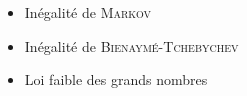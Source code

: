 \begin{itemize}
    \item Inégalité de \textsc{Markov}
    \item Inégalité de \textsc{Bienaymé-Tchebychev}
    \item Loi faible des grands nombres
\end{itemize}